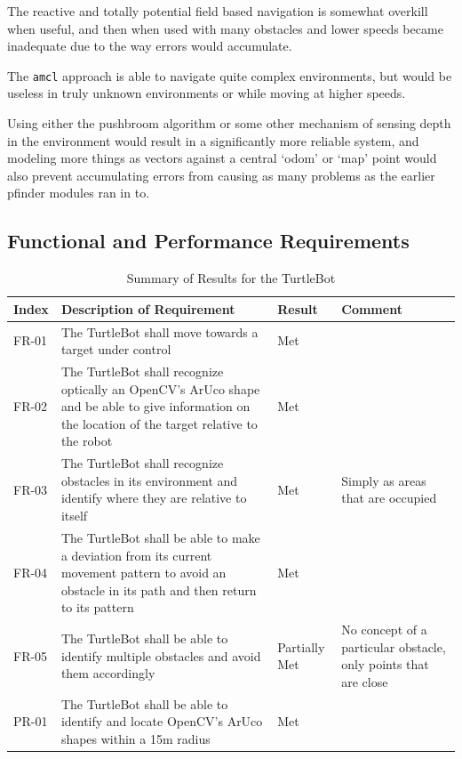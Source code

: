 \documentclass{article}[12]
\begin{document}
The reactive and totally potential field based navigation is somewhat overkill when useful, and then when used with many obstacles and lower speeds became inadequate due to the way errors would accumulate.

The \texttt{amcl}  approach is able to navigate quite complex environments, but would be useless in truly unknown environments or while moving at higher speeds. 

Using either the pushbroom algorithm or some other mechanism of sensing depth in the environment would result in a significantly more reliable system, and modeling more things as vectors against a central `odom' or `map' point would also prevent accumulating errors from causing as many problems as the earlier pfinder modules ran in to.
 
 \subsection{Functional and Performance Requirements}

	\begin{table}[H]
  \small
		\begin{tabular}{p{2cm} p{8cm} p{2cm} p{3cm}} 
			\hline
			{\textbf{Index}} & {\textbf{Description of Requirement}} & {\textbf{Result}} & {\textbf{Comment}} \\ \hline
FR-01 & The TurtleBot shall move towards a target under control & Met & \\
FR-02 & The TurtleBot shall recognize optically an OpenCV's ArUco shape and be able to give information on the location of the target relative to the robot & Met & \\
FR-03 & The TurtleBot shall recognize obstacles in its environment and identify where they are relative to itself & Met & Simply as areas that are occupied \\
FR-04 & The TurtleBot shall be able to make a deviation from its current movement pattern to avoid an obstacle in its path and then return to its pattern & Met & \\
FR-05 & The TurtleBot shall be able to identify multiple obstacles and avoid them accordingly & Partially Met & No concept of a particular obstacle, only points that are close \\
PR-01 & The TurtleBot shall be able to identify and locate OpenCV's ArUco shapes within a 15m radius & Met & \\ \hline
     \end{tabular}
     \caption{Summary of Results for the TurtleBot}
     \label{table:turtlbotresults}
 \end{table}
\end{document}
